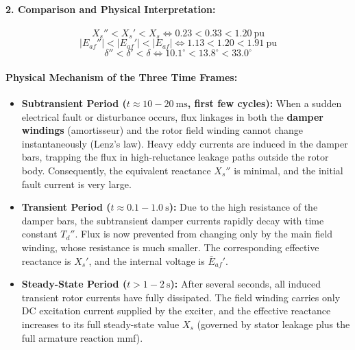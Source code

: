 \paragraph{2. Comparison and Physical Interpretation:}
\begin{equation}
    X_s'' < X_s' < X_s \iff 0.23 < 0.33 < 1.20\ \text{pu}
\end{equation}
\begin{equation}
    |E_{af}''| < |E_{af}'| < |E_{af}| \iff 1.13 < 1.20 < 1.91\ \text{pu}
\end{equation}
\begin{equation}
    \delta'' < \delta' < \delta \iff 10.1^\circ < 13.8^\circ < 33.0^\circ
\end{equation}

\paragraph{Physical Mechanism of the Three Time Frames:}
\begin{itemize}
    \item \textbf{Subtransient Period ($t \approx 10 - 20\ \text{ms}$, first few cycles):}
    When a sudden electrical fault or disturbance occurs, flux linkages in both the \textbf{damper windings} (amortisseur) and the rotor field winding cannot change instantaneously (Lenz's law). Heavy eddy currents are induced in the damper bars, trapping the flux in high-reluctance leakage paths outside the rotor body. Consequently, the equivalent reactance $X_s''$ is minimal, and the initial fault current is very large.
    
    \item \textbf{Transient Period ($t \approx 0.1 - 1.0\ \text{s}$):}
    Due to the high resistance of the damper bars, the subtransient damper currents rapidly decay with time constant $T_d''$. Flux is now prevented from changing only by the main field winding, whose resistance is much smaller. The corresponding effective reactance is $X_s'$, and the internal voltage is $\bar{E}_{af}'$.
    
    \item \textbf{Steady-State Period ($t > 1 - 2\ \text{s}$):}
    After several seconds, all induced transient rotor currents have fully dissipated. The field winding carries only DC excitation current supplied by the exciter, and the effective reactance increases to its full steady-state value $X_s$ (governed by stator leakage plus the full armature reaction mmf).
\end{itemize}
